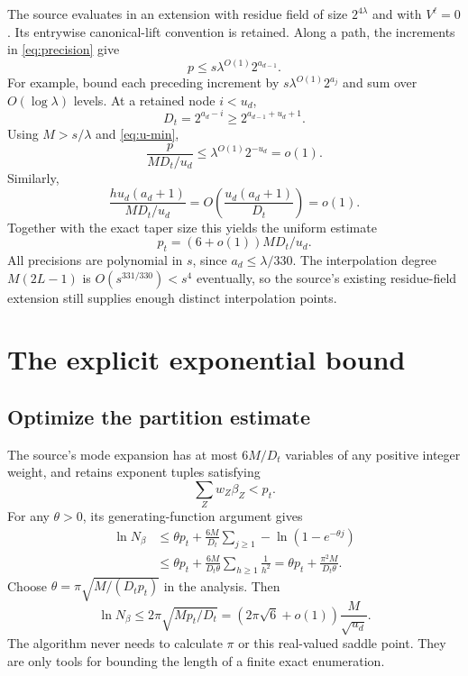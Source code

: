 \documentclass[11pt]{article}
\theoremstyle{remark}
\begin{document}
The source evaluates in an extension with residue field of size $2^{4\lambda}$ and with $V^\ell=0$. Its entrywise canonical-lift convention is retained. Along a path, the increments in \eqref{eq:precision} give
\begin{equation}
 p\le s\lambda^{O(1)}2^{a_{d-1}}.\label{eq:inherited}
\end{equation}
For example, bound each preceding increment by $s\lambda^{O(1)}2^{a_j}$ and sum over $O(\log\lambda)$ levels. At a retained node $i<u_d$,
\[
 D_t=2^{a_d-i}\ge2^{a_{d-1}+u_d+1}.
\]
Using $M>s/\lambda$ and \eqref{eq:u-min},
\[
 \frac{p}{MD_t/u_d}
 \le\lambda^{O(1)}2^{-u_d}=o(1).
\]
Similarly,
\[
 \frac{hu_d(a_d+1)}{MD_t/u_d}
 =O\!\left(\frac{u_d(a_d+1)}{D_t}\right)=o(1).
\]
Together with the exact taper size this yields the uniform estimate
\begin{equation}
 p_t=(6+o(1))MD_t/u_d.\label{eq:p-asymptotic}
\end{equation}
All precisions are polynomial in $s$, since $a_d\le\lambda/330$. The interpolation degree $M(2L-1)$ is $O(s^{331/330})<s^4$ eventually, so the source's existing residue-field extension still supplies enough distinct interpolation points.

\section{The explicit exponential bound}
\label{sec:cost}

\subsection{Optimize the partition estimate}

The source's mode expansion has at most $6M/D_t$ variables of any positive integer weight, and retains exponent tuples satisfying
\[
 \sum_Z w_Z\beta_Z<p_t.
\]
For any $\theta>0$, its generating-function argument gives
\begin{align*}
 \ln N_\beta
 &\le\theta p_t+\frac{6M}{D_t}
       \sum_{j\ge1}-\ln(1-e^{-\theta j})\\
 &\le\theta p_t+\frac{6M}{D_t\theta}
       \sum_{h\ge1}\frac1{h^2}
 =\theta p_t+\frac{\pi^2M}{D_t\theta}.
\end{align*}
Choose $\theta=\pi\sqrt{M/(D_tp_t)}$ in the analysis. Then
\begin{equation}
 \ln N_\beta\le2\pi\sqrt{Mp_t/D_t}
 =(2\pi\sqrt6+o(1))\frac{M}{\sqrt{u_d}}.
 \label{eq:mode-count}
\end{equation}
The algorithm never needs to calculate $\pi$ or this real-valued saddle point. They are only tools for bounding the length of a finite exact enumeration.
\end{document}
